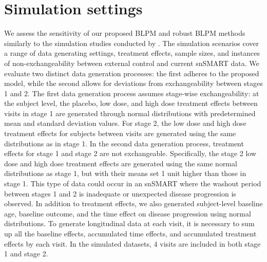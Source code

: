 \section{Simulation settings}
\label{sec:simulation_longitudinal}
We assess the sensitivity of our proposed \ac{BLPM} and robust \ac{BLPM} methods similarly to the simulation studies conducted by \cite{wang2023dynamic}. The simulation scenarios cover a range of data generating settings, treatment effects, sample sizes, and instances of non-exchangeability between external control and current \ac{snSMART} data. We evaluate two distinct data generation processes: the first adheres to the proposed model, while the second allows for deviations from exchangeability between stages 1 and 2. The first data generation process assumes stage-wise exchangeability: at the subject level, the placebo, low dose, and high dose treatment effects between visits in stage 1 are generated through normal distributions with predetermined mean and standard deviation values. For stage 2, the low dose and high dose treatment effects for subjects between visits are generated using the same distributions as in stage 1. In the second data generation process, treatment effects for stage 1 and stage 2 are not exchangeable. Specifically, the stage 2 low dose and high dose treatment effects are generated using the same normal distributions as stage 1, but with their means set 1 unit higher than those in stage 1. This type of data could occur in an \ac{snSMART} where the washout period between stages 1 and 2 is inadequate or unexpected disease progression is observed. In addition to treatment effects, we also generated subject-level baseline age, baseline outcome, and the time effect on disease progression using normal distributions. To generate longitudinal data at each visit, it is necessary to sum up all the baseline effects, accumulated time effects, and accumulated treatment effects by each visit. In the simulated datasets, 4 visits are included in both stage 1 and stage 2.

